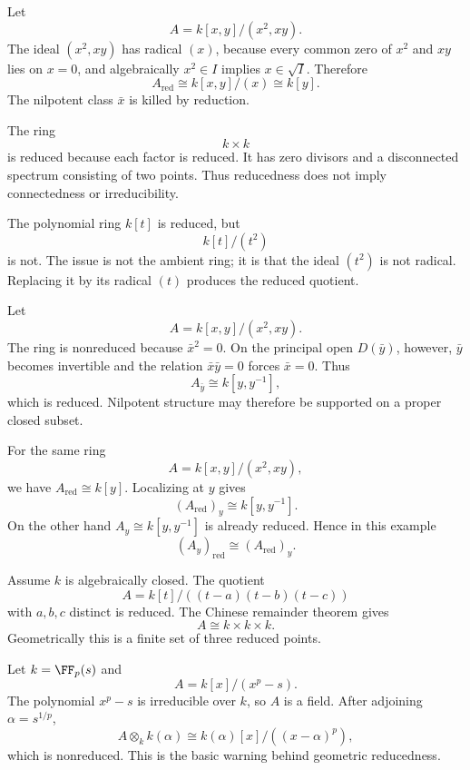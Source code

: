 \begin{example}
Let
\[
A=k[x,y]/(x^2,xy).
\]
The ideal $(x^2,xy)$ has radical $(x)$, because every common zero of $x^2$ and $xy$ lies on
$x=0$, and algebraically $x^2\in I$ implies $x\in\sqrt I$.  Therefore
\[
A_{\mathrm{red}}\cong k[x,y]/(x)\cong k[y].
\]
The nilpotent class $\bar x$ is killed by reduction.
\end{example}

\begin{example}
The ring
\[
k\times k
\]
is reduced because each factor is reduced.  It has zero divisors and a disconnected
spectrum consisting of two points.  Thus reducedness does not imply connectedness or
irreducibility.
\end{example}

\begin{example}
The polynomial ring $k[t]$ is reduced, but
\[
k[t]/(t^2)
\]
is not.  The issue is not the ambient ring; it is that the ideal $(t^2)$ is not radical.
Replacing it by its radical $(t)$ produces the reduced quotient.
\end{example}

\begin{example}
Let
\[
A=k[x,y]/(x^2,xy).
\]
The ring is nonreduced because $\bar x^2=0$.  On the principal open $D(\bar y)$, however,
$\bar y$ becomes invertible and the relation $\bar x\bar y=0$ forces $\bar x=0$.  Thus
\[
A_{\bar y}\cong k[y,y^{-1}],
\]
which is reduced.  Nilpotent structure may therefore be supported on a proper closed subset.
\end{example}

\begin{example}
For the same ring
\[
A=k[x,y]/(x^2,xy),
\]
we have $A_{\mathrm{red}}\cong k[y]$.  Localizing at $y$ gives
\[
(A_{\mathrm{red}})_y\cong k[y,y^{-1}].
\]
On the other hand $A_y\cong k[y,y^{-1}]$ is already reduced.  Hence in this example
\[
(A_y)_{\mathrm{red}}\cong(A_{\mathrm{red}})_y.
\]
\end{example}

\begin{example}
Assume $k$ is algebraically closed.  The quotient
\[
A=k[t]/((t-a)(t-b)(t-c))
\]
with $a,b,c$ distinct is reduced.  The Chinese remainder theorem gives
\[
A\cong k\times k\times k.
\]
Geometrically this is a finite set of three reduced points.
\end{example}

\begin{example}
Let $k=\FF_p(s)$ and
\[
A=k[x]/(x^p-s).
\]
The polynomial $x^p-s$ is irreducible over $k$, so $A$ is a field.  After adjoining
$\alpha=s^{1/p}$,
\[
A\otimes_k k(\alpha)
\cong
k(\alpha)[x]/((x-\alpha)^p),
\]
which is nonreduced.  This is the basic warning behind geometric reducedness.
\end{example}
